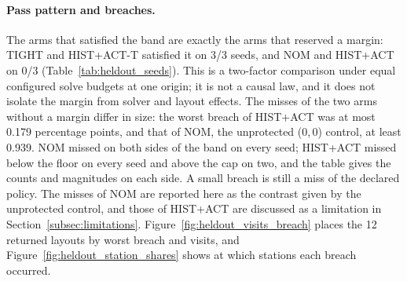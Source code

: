 \paragraph{Pass pattern and breaches.} The arms that satisfied the band are exactly the arms that reserved a margin: TIGHT and HIST+ACT-T satisfied it on 3/3 seeds, and NOM and HIST+ACT on 0/3 (Table~\ref{tab:heldout_seeds}). This is a two-factor comparison under equal configured solve budgets at one origin; it is not a causal law, and it does not isolate the margin from solver and layout effects. The misses of the two arms without a margin differ in size: the worst breach of HIST+ACT was at most 0.179 percentage points, and that of NOM, the unprotected (0,\,0) control, at least 0.939. NOM missed on both sides of the band on every seed; HIST+ACT missed below the floor on every seed and above the cap on two, and the table gives the counts and magnitudes on each side. A small breach is still a miss of the declared policy. The misses of NOM are reported here as the contrast given by the unprotected control, and those of HIST+ACT are discussed as a limitation in Section~\ref{subsec:limitations}. Figure~\ref{fig:heldout_visits_breach} places the 12 returned layouts by worst breach and visits, and Figure~\ref{fig:heldout_station_shares} shows at which stations each breach occurred.

